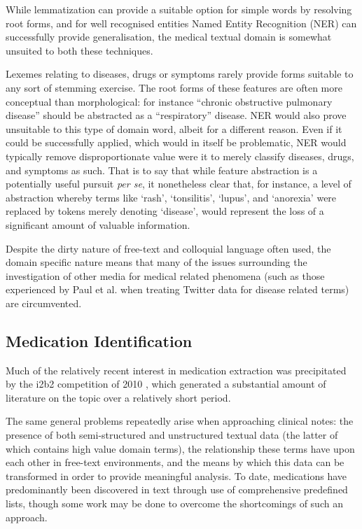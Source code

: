 While lemmatization can provide a suitable option for simple words by resolving root forms, and for well recognised entities Named Entity Recognition (NER)\cite{nadeau2007survey} can successfully provide generalisation, the medical textual domain is somewhat unsuited to both these techniques.

Lexemes relating to diseases, drugs or symptoms rarely provide forms suitable to any sort of stemming exercise. The root forms of these features are often more conceptual than morphological: for instance “chronic obstructive pulmonary disease” should be abstracted as a “respiratory” disease. NER would also prove unsuitable to this type of domain word, albeit for a different reason. Even if it could be successfully applied, which would in itself be problematic, NER would typically remove disproportionate value were it to merely classify diseases, drugs, and symptoms as such. That is to say that while feature abstraction is a potentially useful pursuit \textit{per se}, it nonetheless clear that, for instance,  a level of abstraction whereby terms like `rash', `tonsilitis', `lupus', and `anorexia' were replaced by tokens merely denoting `disease', would represent the loss of a significant amount of valuable information.

Despite the dirty nature of free-text and colloquial language often used, the domain specific nature means that many of the issues surrounding the investigation of other media for medical related phenomena (such as those experienced by Paul et al. when treating Twitter data for disease related terms)\cite{paul2012model} are circumvented.


\subsection{Medication Identification}
\label{section-rr-medication-identification}

Much of the relatively recent interest in medication extraction was precipitated by the i2b2 competition of 2010 \cite{demner2018finding}, which generated a substantial amount of literature on the topic over a relatively short period.  

The same general problems repeatedly arise when approaching clinical notes: the presence of both semi-structured and unstructured textual data (the latter of which contains high value domain terms), the relationship these terms have upon each other in free-text environments, and the means by which this data can be transformed in order to provide meaningful analysis. To date, medications have predominantly been discovered in text through use of comprehensive predefined lists, though some work may be done to overcome the shortcomings of such an approach. 

